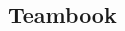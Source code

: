 \documentclass[10pt,a4paper]{article}
\begin{document}
\begin{multicols}{2}

\section*{Teambook}



\end{multicols}
\end{document}
